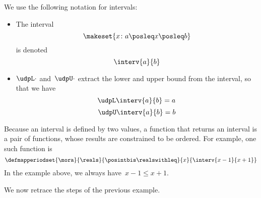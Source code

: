 We use the following notation for intervals:
\begin{itemize}
    \item The interval
          \begin{equation}
              \label{eq:interv-1}
              \makeset{x\colon a \posleq x \posleq b}
          \end{equation}
          is denoted
          \begin{equation}
              \label{eq:interv-2}
              \interv{a}{b}
          \end{equation}
    \item $\udpL\cdot$ and~$\udpU\cdot$ extract the lower and upper bound from the interval, so that we have
          \begin{equation}
              \label{eq:interv-L}
              \udpL \interv{a}{b} = a
          \end{equation}
          \begin{equation}
              \label{eq:interv-U}
              \udpU \interv{a}{b} = b
          \end{equation}
\end{itemize}
%
Because an interval is defined by two values, a function that returns an interval is a pair of functions, whose results are constrained to be ordered.
For example, one such function is
\begin{equation}
    \label{eq:interval-func-example}
    \defmapperiodset{
        \mora
    }{
        \reals
    }{
        \posintbis\realswithleq
    }{
        x
    }{
        \interv{x-1}{x+1}
    }
\end{equation}
In the example above, we always have~$x-1\leq x+1$.

We now retrace the steps of the previous example.

